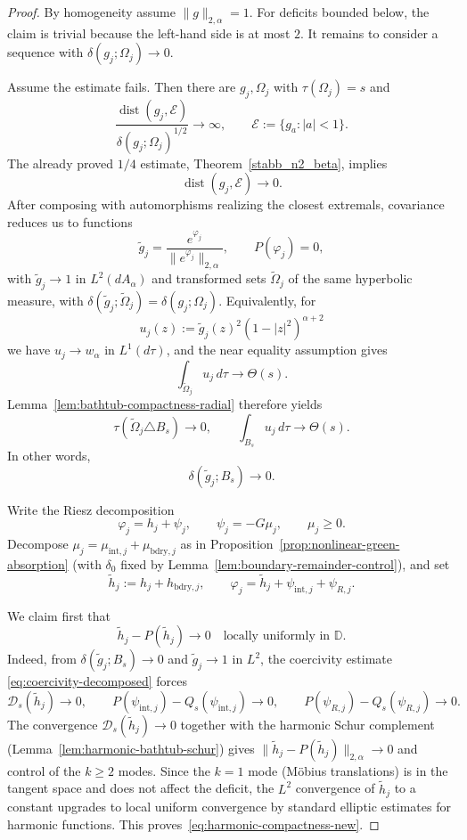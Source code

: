 \documentclass[a4paper,10pt]{amsart}
\newcommand{\D}{\mathbb{D}}
\begin{document}
\begin{proof}
By homogeneity assume $\|g\|_{2,\alpha}=1$. For deficits bounded below, the
claim is trivial because the left-hand side is at most $2$. It remains to
consider a sequence with $\delta(g_j;\Omega_j)\to0$.

Assume the estimate fails. Then there are $g_j,\Omega_j$ with
$\tau(\Omega_j)=s$ and
\[
\frac{\operatorname{dist}(g_j,\mathcal E)}
{\delta(g_j;\Omega_j)^{1/2}}\to\infty,
\qquad
\mathcal E:=\{g_a:|a|<1\}.
\]
The already proved $1/4$ estimate, Theorem~\ref{stabb_n2_beta}, implies
\[
\operatorname{dist}(g_j,\mathcal E)\to0.
\]
After composing with automorphisms realizing the closest extremals, covariance
reduces us to functions
\[
\widetilde g_j=\frac{e^{\varphi_j}}{\|e^{\varphi_j}\|_{2,\alpha}},
\qquad
P(\varphi_j)=0,
\]
with $\widetilde g_j\to1$ in $L^2(dA_\alpha)$ and transformed sets
$\widetilde\Omega_j$ of the same hyperbolic measure, with
$\delta(\widetilde g_j;\widetilde\Omega_j)=\delta(g_j;\Omega_j)$.
Equivalently, for
\[
u_j(z):=
\widetilde g_j(z)^2(1-|z|^2)^{\alpha+2}
\]
we have $u_j\to w_\alpha$ in $L^1(d\tau)$, and the near equality assumption
gives
\[
\int_{\widetilde\Omega_j}u_j\,d\tau\longrightarrow\Theta(s).
\]
Lemma~\ref{lem:bathtub-compactness-radial} therefore yields
\[
\tau(\widetilde\Omega_j\triangle B_s)\to0,
\qquad
\int_{B_s}u_j\,d\tau\to\Theta(s).
\]
In other words,
\[
\delta(\widetilde g_j;B_s)\to0.
\]

Write the Riesz decomposition
\[
\varphi_j=h_j+\psi_j,\qquad
\psi_j=-G\mu_j,\qquad \mu_j\ge0.
\]
Decompose $\mu_j=\mu_{\mathrm{int},j}+\mu_{\mathrm{bdry},j}$ as in
Proposition~\ref{prop:nonlinear-green-absorption} (with $\delta_0$ fixed by
Lemma~\ref{lem:boundary-remainder-control}), and set
\[
\widetilde h_j:=h_j+h_{\mathrm{bdry},j},\qquad
\varphi_j=\widetilde h_j+\psi_{\mathrm{int},j}+\psi_{R,j}.
\]

We claim first that
\begin{equation}\label{eq:harmonic-compactness-new}
\widetilde h_j-P(\widetilde h_j)\longrightarrow0
\quad\text{locally uniformly in }\D .
\end{equation}
Indeed, from $\delta(\widetilde g_j;B_s)\to0$ and
$\widetilde g_j\to1$ in $L^2$, the coercivity estimate
\eqref{eq:coercivity-decomposed} forces
\[
\mathcal D_s(\widetilde h_j)\to0,\qquad
P(\psi_{\mathrm{int},j})-Q_s(\psi_{\mathrm{int},j})\to0,\qquad
P(\psi_{R,j})-Q_s(\psi_{R,j})\to0.
\]
The convergence $\mathcal D_s(\widetilde h_j)\to0$ together with the harmonic
Schur complement (Lemma~\ref{lem:harmonic-bathtub-schur}) gives
$\|\widetilde h_j-P(\widetilde h_j)\|_{2,\alpha}\to0$ and control of the $k\ge2$ modes.
Since the $k=1$ mode (M\"obius translations) is in the tangent space and
does not affect the deficit, the $L^2$ convergence of $\widetilde h_j$ to a constant
upgrades to local uniform convergence by standard elliptic estimates for
harmonic functions.  This proves~\eqref{eq:harmonic-compactness-new}.


\end{proof}
\end{document}
